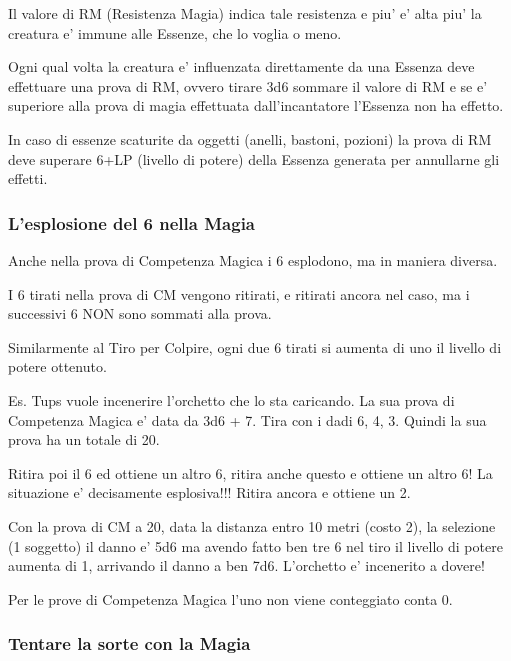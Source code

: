 \documentclass[a4paper,11pt,twoside,openany]{book}
\begin{document}
Il valore di RM (Resistenza Magia) indica tale resistenza e piu' e' alta piu' la creatura e' immune alle Essenze, che lo voglia o meno.

Ogni qual volta la creatura e' influenzata direttamente da una Essenza deve effettuare una prova di RM, ovvero tirare 3d6 sommare il valore di RM e se e' superiore alla prova di magia effettuata dall'incantatore l'Essenza non ha effetto.

In caso di essenze scaturite da oggetti (anelli, bastoni, pozioni)
la prova di RM deve superare 6+LP (livello di potere) della Essenza
generata per annullarne gli effetti.

\subsubsection{L'esplosione del 6 nella Magia}

\label{lesplosione-del-6-nella-magia}

Anche nella prova di Competenza Magica i 6 esplodono, ma in maniera diversa.

I 6 tirati nella prova di CM vengono ritirati, e ritirati ancora nel caso, ma i successivi 6 NON sono sommati alla prova.

Similarmente al Tiro per Colpire, ogni due 6 tirati si aumenta di uno il livello di potere ottenuto.

Es. Tups vuole incenerire l'orchetto che lo sta caricando. La sua prova di Competenza Magica e' data da 3d6 + 7. Tira con i dadi 6, 4, 3. Quindi la sua prova ha un totale di 20.

Ritira poi il 6 ed ottiene un altro 6, ritira anche questo e ottiene un altro 6! La situazione e' decisamente esplosiva!!! Ritira ancora e ottiene un 2.

Con la prova di CM a 20, data la distanza entro 10 metri (costo 2), la selezione (1 soggetto) il danno e' 5d6 ma avendo fatto ben tre 6 nel tiro il livello di potere aumenta di 1, arrivando il danno a ben 7d6. L'orchetto e' incenerito a dovere!

Per le prove di Competenza Magica l'uno non viene conteggiato conta 0.

\subsubsection{Tentare la sorte con la Magia}

\label{tentare-la-sorte-con-la-magia}
\end{document}
